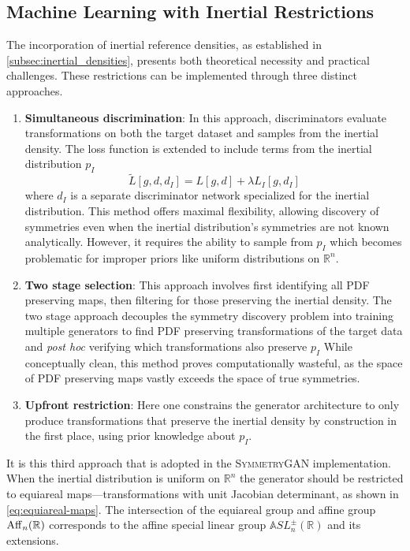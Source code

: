     \subsection{Machine Learning with Inertial Restrictions}
    The incorporation of inertial reference densities, as established in \cref{subsec:inertial_densities}, presents both theoretical necessity and practical challenges.
    These restrictions can be implemented through three distinct approaches.
    \begin{enumerate}
        \item \textbf{Simultaneous discrimination}:
            In this approach, discriminators evaluate transformations on both the target dataset and samples from the inertial density.
            The loss function is extended to include terms from the inertial distribution \(p_I\)
            \[
                \widetilde L[g,d,d_I] = L[g,d] + \lambda L_I[g,d_I]
            \]
            where \(d_I\) is a separate discriminator network specialized for the inertial distribution.
            This method offers maximal flexibility, allowing discovery of symmetries even when the inertial distribution's symmetries are not known analytically.
            However, it requires the ability to sample from \(p_I\) which becomes problematic for improper priors like uniform distributions on \(\mathbb{R}^n\).
        \item \textbf{Two stage selection}:
            This approach involves first identifying all PDF preserving maps, then filtering for those preserving the inertial density.
            The two stage approach decouples the symmetry discovery problem into training multiple generators to find PDF preserving transformations of the target data and \textit{post hoc} verifying which transformations also preserve \(p_I\)
            While conceptually clean, this method proves computationally wasteful, as the space of PDF preserving maps vastly exceeds the space of true symmetries.
        \item \textbf{Upfront restriction}:
            Here one constrains the generator architecture to only produce transformations that preserve the inertial density by construction in the first place, using prior knowledge about \(p_I\).
    \end{enumerate}
    
    It is this third approach that is adopted in the \textsc{SymmetryGAN} implementation.
    When the inertial distribution is uniform on \(\mathbb{R}^n\) the generator should be restricted to equiareal maps---transformations with unit Jacobian determinant, as shown in \cref{eq:equiareal-maps}.
    The intersection of the equiareal group and affine group \(\operatorname{Aff}_n(\mathbb{R})\) corresponds to the affine special linear group \(\mathbb{A}SL^\pm_n(\mathbb{R})\) and its extensions.

